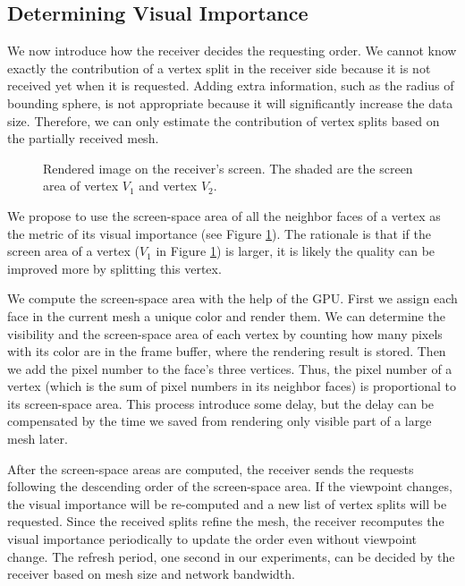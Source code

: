      \subsection{Determining Visual Importance}
     \label{ss:dstream:visual}
     We now introduce how the receiver decides the requesting order. 
     We cannot know exactly the contribution of a vertex split in the receiver side
     because it is not received yet when it is requested.
     Adding extra information, such as the radius of bounding sphere, is not appropriate
     because it will significantly increase the data size. 
     Therefore, we can only estimate the contribution of vertex splits based on the 
     partially received mesh.
     
    \begin{figure}
    \centering
    \caption{Rendered image on the receiver's screen. 
    The shaded are the screen area of vertex $V_1$ and vertex $V_2$.
    \label{dstream:screen_area}}
    \end{figure}
     We propose to use the screen-space area of all the neighbor faces of a vertex as the 
     metric of its visual importance (see Figure \ref{dstream:screen_area}).
     The rationale is that if the screen area of a vertex ($V_1$ in Figure \ref{dstream:screen_area}) 
    is larger, it is likely the quality can be improved more by splitting this vertex. 
    
    We compute the screen-space area with the help of the GPU. 
    First we assign each face in the current mesh a unique color and render them. 
    We can determine the visibility
    and the screen-space area of each vertex by counting how many pixels with its color
    are in the frame buffer, where the rendering result is stored. 
    Then we add the pixel number to the face's three vertices. Thus, the
    pixel number of a vertex (which is the sum of pixel numbers in its neighbor faces)
    is proportional to its screen-space area.
    This process introduce some delay, but the delay can be compensated by the time
    we saved from rendering only visible part of a large mesh later. 
    
    After the screen-space areas are computed, 
    the receiver sends the requests following the descending order of the 
    screen-space area. If the viewpoint changes, the visual importance will
    be re-computed and a new list of vertex splits will be requested. Since the received
    splits refine the mesh, the receiver recomputes the visual importance periodically
    to update the order even without viewpoint change. The refresh period, one second
    in our experiments, can be decided
    by the receiver based on mesh size and network bandwidth.

